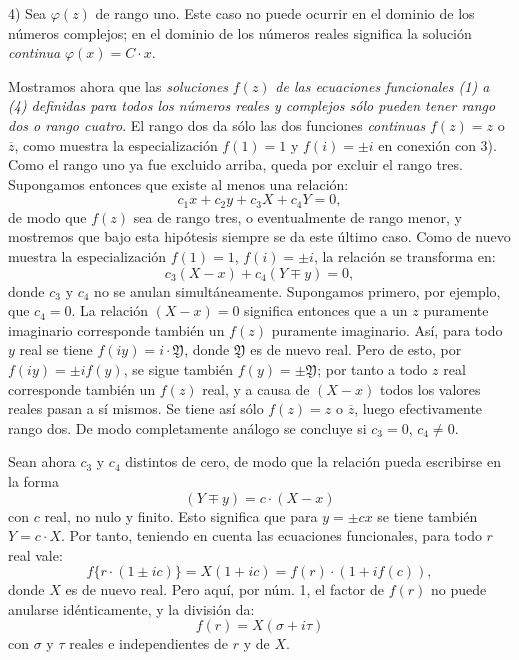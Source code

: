 4) Sea $\varphi(z)$ de rango uno. Este caso no puede ocurrir en el dominio de los números complejos; en el dominio de los números reales significa la solución \emph{continua} $\varphi(x)=C\cdot x$.

Mostramos ahora que las \emph{soluciones} $f(z)$ \emph{de las ecuaciones funcionales (1) a (4) definidas para todos los números reales y complejos sólo pueden tener rango dos o rango cuatro}. El rango dos da sólo las dos funciones \emph{continuas} $f(z)=z$ o $\overline z$, como muestra la especialización $f(1)=1$ y $f(i)=\pm i$ en conexión con 3). Como el rango uno ya fue excluido arriba, queda por excluir el rango tres. Supongamos entonces que existe al menos una relación:
\[
c_1x+c_2y+c_3X+c_4Y=0,
\]
de modo que $f(z)$ sea de rango tres, o eventualmente de rango menor, y mostremos que bajo esta hipótesis siempre se da este último caso. Como de nuevo muestra la especialización $f(1)=1$, $f(i)=\pm i$, la relación se transforma en:
\[
c_3(X-x)+c_4(Y\mp y)=0,
\]
donde $c_3$ y $c_4$ no se anulan simultáneamente. Supongamos primero, por ejemplo, que $c_4=0$. La relación $(X-x)=0$ significa entonces que a un $z$ puramente imaginario corresponde también un $f(z)$ puramente imaginario. Así, para todo $y$ real se tiene $f(iy)=i\cdot\mathfrak Y$, donde $\mathfrak Y$ es de nuevo real. Pero de esto, por $f(iy)=\pm i f(y)$, se sigue también $f(y)=\pm\mathfrak Y$; por tanto a todo $z$ real corresponde también un $f(z)$ real, y a causa de $(X-x)$ todos los valores reales pasan a sí mismos. Se tiene así sólo $f(z)=z$ o $\overline z$, luego efectivamente rango dos. De modo completamente análogo se concluye si $c_3=0$, $c_4\ne0$.

Sean ahora $c_3$ y $c_4$ distintos de cero, de modo que la relación pueda escribirse en la forma
\[
(Y\mp y)=c\cdot(X-x)
\]
con $c$ real, no nulo y finito. Esto significa que para $y=\pm cx$ se tiene también $Y=c\cdot X$. Por tanto, teniendo en cuenta las ecuaciones funcionales, para todo $r$ real vale:
\[
f\{r\cdot(1\pm ic)\}=X(1+ic)=f(r)\cdot(1+i f(c)),
\]
donde $X$ es de nuevo real. Pero aquí, por núm. 1, el factor de $f(r)$ no puede anularse idénticamente, y la división da:
\[
f(r)=X(\sigma+i\tau)
\]
con $\sigma$ y $\tau$ reales e independientes de $r$ y de $X$.

